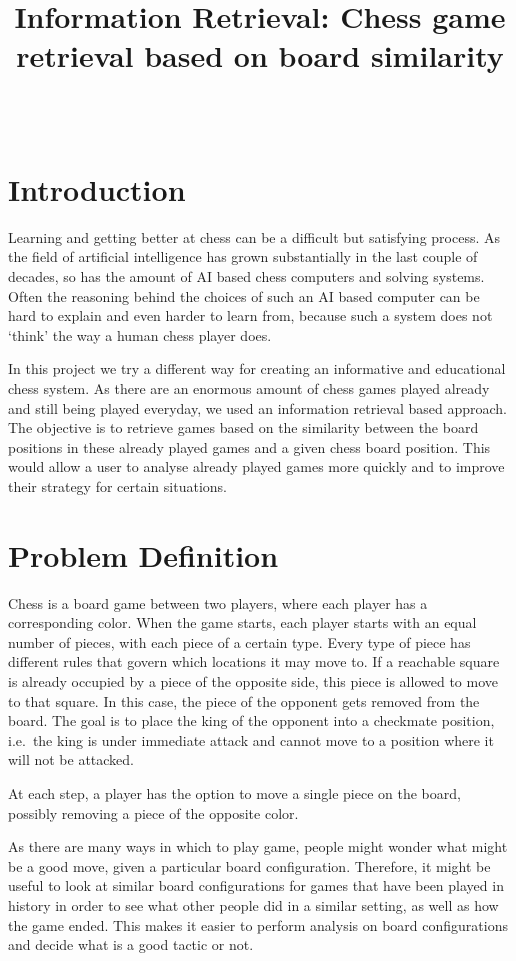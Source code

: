 \documentclass[11pt]{article}
\title{Information Retrieval: Chess game retrieval based on board similarity}
\author{\studentA \\ \studentB}
\begin{document}
    \maketitle


    \section{Introduction}

    Learning and getting better at chess can be a difficult but satisfying process. As the field of artificial intelligence has grown substantially in the last couple of decades, so has the amount of AI based chess computers and solving systems. Often the reasoning behind the choices of such an AI based computer can be hard to explain and even harder to learn from, because such a system does not `think' the way a human chess player does.

    In this project we try a different way for creating an informative and educational chess system. As there are an enormous amount of chess games played already and still being played everyday, we used an information retrieval based approach. The objective is to retrieve games based on the similarity between the board positions in these already played games and a given chess board position. This would allow a user to analyse already played games more quickly and to improve their strategy for certain situations.


    \section{Problem Definition}

    Chess is a board game between two players, where each player has a corresponding color. When the game starts, each player starts with an equal number of pieces, with each piece of a certain type. Every type of piece has different rules that govern which locations it may move to. If a reachable square is already occupied by a piece of the opposite side, this piece is allowed to move to that square. In this case, the piece of the opponent gets removed from the board. The goal is to place the king of the opponent into a checkmate position, i.e.\ the king is under immediate attack and cannot move to a position where it will not be attacked.

    At each step, a player has the option to move a single piece on the board, possibly removing a piece of the opposite color.

    As there are many ways in which to play game, people might wonder what might be a good move, given a particular board configuration. Therefore, it might be useful to look at similar board configurations for games that have been played in history in order to see what other people did in a similar setting, as well as how the game ended. This makes it easier to perform analysis on board configurations and decide what is a good tactic or not.
\end{document}
